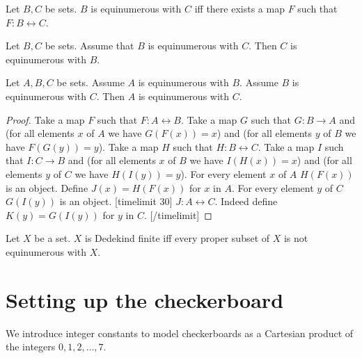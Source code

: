 \documentclass{article}
\begin{document}
\begin{forthel}

\begin{definition}
    Let $B, C$ be sets.
    $B$ is equinumerous with $C$ iff there exists a map $F$ such that
    $F : B\leftrightarrow C$.
\end{definition}

\begin{lemma}
    Let $B, C$ be sets.
    Assume that $B$ is equinumerous with $C$.
    Then $C$ is equinumerous with $B$.
\end{lemma}

\begin{lemma}
    Let $A, B, C$ be sets.
    Assume $A$ is equinumerous with $B$.
    Assume $B$ is equinumerous with $C$.
    Then $A$ is equinumerous with $C$.
\end{lemma}
\begin{proof}
    Take a map $F$ such that $F : A\leftrightarrow B$.
    Take a map $G$ such that $G : B\rightarrow A$
    and (for all elements $x$ of $A$ we have $G(F(x)) = x$) and
    (for all elements $y$ of $B$ we have $F(G(y))=y$).
    Take a map $H$ such that $H : B\leftrightarrow C$.
    Take a map $I$ such that $I : C\rightarrow B$ and (for all elements $x$ of $B$ we have $I(H(x)) = x$) and
    (for all elements $y$ of $C$ we have $H(I(y))=y$).
    For every element $x$ of $A$ $H(F(x))$ is an object.
    Define $J(x) = H(F(x))$ for $x$ in $A$.
    For every element $y$ of $C$ $G(I(y))$ is an object.
[timelimit 30]
    $J : A\leftrightarrow C$. Indeed define $K(y) = G(I(y))$ for $y$ in $C$.
[/timelimit]
\end{proof}

\begin{definition}
    Let $X$ be a set.
    $X$ is Dedekind finite iff every proper subset of $X$
    is not equinumerous with $X$.
\end{definition}

\end{forthel}




\section{Setting up the checkerboard}

We introduce integer constants
to model checkerboards as a Cartesian product of the
integers $0, 1, 2, \ldots, 7$.
\end{document}
